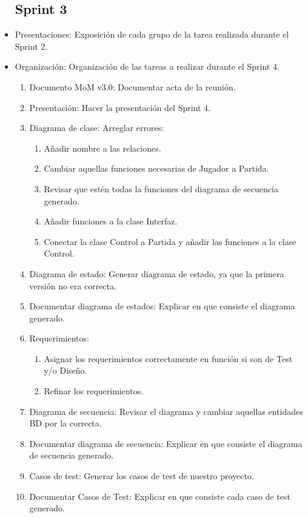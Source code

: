 \begin{itemize}
\subsection{Sprint 3}
\item Presentaciones: Exposición de cada grupo de la tarea realizada durante el Sprint 2.
\item Organización: Organización de las tareas a realizar durante el Sprint 4.
\begin{enumerate}
	\item Documento MoM v3.0: Documentar acta de la reunión.
	\item Presentación: Hacer la presentación del Sprint 4.
	\item Diagrama de clase:	 Arreglar errores:
	\begin{enumerate}
		\item Añadir nombre a las relaciones.
		\item Cambiar aquellas funciones necesarias de Jugador a Partida.
		\item Revisar que estén todas la funciones del diagrama de secuencia generado.
		\item Añadir funciones a la clase Interfaz.
		\item Conectar la clase Control a Partida y añadir las funciones a la clase Control.
	\end{enumerate}
	\item Diagrama de estado: Generar diagrama de estado, ya que la primera versión no era correcta.
	\item Documentar diagrama de estados: Explicar en que consiste el diagrama generado.
	\item Requerimientos:
	\begin{enumerate}
		\item Asignar los requerimientos correctamente en función si son de Test y/o Diseño.
		\item Refinar los requerimientos.
	\end{enumerate}
	\item Diagrama de secuencia: Revisar el diagrama y cambiar aquellas entidades BD por la correcta.
	\item Documentar diagrama de secuencia: Explicar en que consiste el diagrama de secuencia generado.
	\item Casos de test: Generar los casos de test de nuestro proyecto.
	\item Documentar Casos de Test: Explicar en que consiste cada caso de test generado.
\end{enumerate}



\end{itemize}

